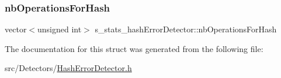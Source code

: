 \mbox{\label{structs__stats__hashErrorDetector_a64dab27e3314cfc2a233f620f0309782}} 
\subsubsection{\texorpdfstring{nb\+Operations\+For\+Hash}{nbOperationsForHash}}
{\footnotesize\ttfamily vector$<$unsigned int$>$ s\+\_\+stats\+\_\+hash\+Error\+Detector\+::nb\+Operations\+For\+Hash}



The documentation for this struct was generated from the following file\+:\begin{DoxyCompactItemize}
\item 
src/\+Detectors/\hyperlink{HashErrorDetector_8h}{Hash\+Error\+Detector.\+h}\end{DoxyCompactItemize}
